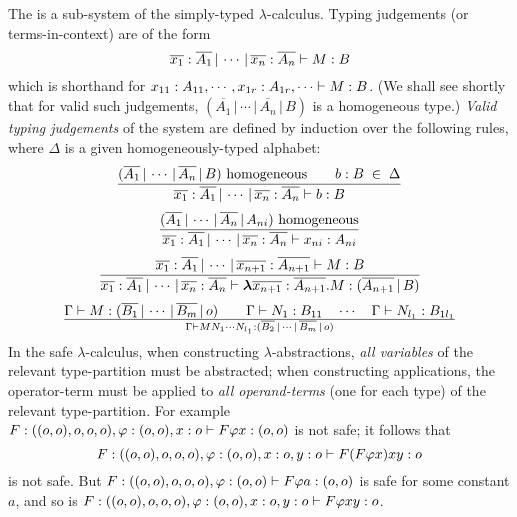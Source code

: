 The  is a sub-system of the
simply-typed $\lambda$-calculus. Typing judgements (or
terms-in-context) are of the form
\begin{equation}
\nonumber {{\overline{x_1}:\overline{A_1} \, | \, \cdots \, | \,
\overline{x_n} :  \overline{A_n}} \vdash {M : B}} 
\end{equation}
which is shorthand for
${{x_{11} : A_{11}, \cdots, x_{1r}: A_{1r}, \cdots} \vdash {M : B}}$. (We shall see shortly
that for valid such judgements, $(\overline{A_1} \, | \, \cdots \,
| \, \overline{A_n} \, | \, B)$ is a homogeneous type.)
\emph{Valid typing judgements} of the system are defined by
induction over the following rules, where $\Delta$ is a given
homogeneously-typed alphabet:
\[{{(\overline{A_1}
\, | \, \cdots \, | \, \overline{A_n} \, | \, B) \hbox{
homogeneous} \qquad {b : B} \; \in \; \Delta} \over
{{{\overline{x_1} : \overline{A_1}\, | \, \cdots\, | \,
\overline{x_n} : \overline{A_n}} \vdash {b : B}}}}\]
\[{{(\overline{A_1}
\, | \, \cdots \, | \, \overline{A_n} \, | \, A_{ni}) \hbox{
homogeneous}} \over {{{\overline{x_1} : \overline{A_1}\, | \,
\cdots\, | \, \overline{x_n} : \overline{A_n}} \vdash {x_{ni} :
A_{ni}}}}}\]
\[
{
{{{\overline{x_1} :
\overline{A_1}\, | \, \cdots\, | \, \overline{x_{n+1}} : \overline{A_{n+1}}} \vdash {M : B}}}
\over
{{{\overline{x_1} :
\overline{A_1}\, | \, \cdots\, | \, \overline{x_{n}} : \overline{A_{n}}} \vdash {{\hbox{\boldmath $\lambda$}{\overline{x_{n+1}} : \overline{A_{n+1}}}.{M}} : (\overline{A_{n+1}} \, | \, B)}}}
}
\]
\[{{{\Gamma} \vdash {M : (\overline{B_1} \, | \, \cdots \, | \, \overline{B_m} \, | \, o)}} \qquad
{{\Gamma} \vdash {N_1 : B_{11}}} \quad \cdots \quad {{\Gamma} \vdash {N_{l_1}
: B_{1l_1}}} }\over{ {{\Gamma} \vdash {M N_1 \cdots N_{l_1} :
(\overline{B_2} \, | \, \cdots \, | \, \overline{B_m} \, | \, o)}}}
\] In the safe $\lambda$-calculus, when constructing
$\lambda$-abstractions, \emph{all variables} of the relevant
type-partition must be abstracted; when constructing applications,
the operator-term must be applied to \emph{all operand-terms} (one
for each type) of the relevant type-partition. For example ${{F
: ((o, o), o, o, o), \varphi : (o, o), x : o} \vdash {F \varphi x : (o,
o)}}$ is not safe; it follows that \[{{F : ((o, o), o, o, o),
\varphi : (o, o), x : o, y : o} \vdash { F(F \varphi x)xy : o}}\] is not
safe. But ${{F : ((o, o), o, o, o), \varphi : (o, o)} \vdash {F \varphi
a: (o, o)}}$ is safe for some constant $a$, and so is ${{F :
((o, o), o, o, o), \varphi : (o, o), x : o, y : o} \vdash {F \varphi x y:
o}}$.

